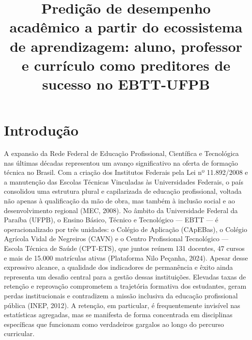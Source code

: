 

\title{Predição de desempenho acadêmico a partir do ecossistema de aprendizagem: aluno, professor e currículo como preditores de sucesso no EBTT-UFPB}

\def\autorA{BIANCA MARIA SOUZA PEDROSA\\
\texttt{bias.marias.ss.pp@gmail.com}}

\def\autorB{ ISABELLY RODRIGUES DO REGO SILVA \\
\texttt{isabelly.rodrigues@academico.ufpb.br}}

\def\autorC{ MARIA CAROLINA DE FRAGA\\
\texttt{mcf2@academico.ufpb.br}}





\chapter{Introdução}
%
A expansão da Rede Federal de Educação Profissional, Científica e Tecnológica nas últimas décadas representou um avanço significativo na oferta de formação técnica no Brasil. Com a criação dos Institutos Federais pela Lei nº 11.892/2008 e a manutenção das Escolas Técnicas Vinculadas às Universidades Federais, o país consolidou uma estrutura plural e capilarizada de educação profissional, voltada não apenas à qualificação da mão de obra, mas também à inclusão social e ao desenvolvimento regional (MEC, 2008). No âmbito da Universidade Federal da Paraíba (UFPB), o Ensino Básico, Técnico e Tecnológico — EBTT — é operacionalizado por três unidades: o Colégio de Aplicação (CApEBas), o Colégio Agrícola Vidal de Negreiros (CAVN) e o Centro Profissional Tecnológico — Escola Técnica de Saúde (CPT-ETS), que juntos reúnem 131 docentes, 47 cursos e mais de 15.000 matrículas ativas (Plataforma Nilo Peçanha, 2024).
Apesar desse expressivo alcance, a qualidade dos indicadores de permanência e êxito ainda representa um desafio central para a gestão dessas instituições. Elevadas taxas de retenção e reprovação comprometem a trajetória formativa dos estudantes, geram perdas institucionais e contradizem a missão inclusiva da educação profissional pública (INEP, 2012). A retenção, em particular, é frequentemente invisível nas estatísticas agregadas, mas se manifesta de forma concentrada em disciplinas específicas que funcionam como verdadeiros gargalos ao longo do percurso curricular.
	
	
